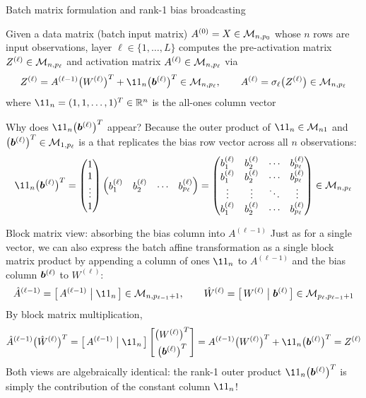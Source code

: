 \documentclass[aspectratio=169]{beamer}\usepackage[]{graphicx}\usepackage[]{xcolor}
\begin{document}
\begin{frame}{Batch matrix formulation and rank-1 bias broadcasting}
\begin{importantdefinition}
\label{def:mlp-batch-layer}
Given a data matrix (batch input matrix) $A^{(0)} = X \in \mathcal{M}_{n, p_0}$ whose $n$ rows are input observations, layer $\ell \in \{1, \ldots, L\}$ computes the pre-activation matrix $Z^{(\ell)} \in \mathcal{M}_{n, p_\ell}$ and activation matrix $A^{(\ell)} \in \mathcal{M}_{n, p_\ell}$ via
\[
Z^{(\ell)} = A^{(\ell-1)} \big(W^{(\ell)}\big)^T + \11_n \big(\bb^{(\ell)}\big)^T \in \M_{n, p_\ell}, \qquad
A^{(\ell)} = \sigma_\ell\big(Z^{(\ell)}\big) \in \M_{n, p_\ell}
\]
where $\11_n = (1, 1, \ldots, 1)^T \in \IR^n$ is the all-ones column vector
\end{importantdefinition}
\vfill
Why does $\11_n \big(\bb^{(\ell)}\big)^T$ appear? Because the outer product of $\11_n \in \M_{n1}$ and $\big(\bm{b}^{(\ell)}\big)^T \in \mathcal{M}_{1, p_\ell}$ is a  that replicates the bias row vector across all $n$ observations:
\[
\11_n \big(\bb^{(\ell)}\big)^T =
\begin{pmatrix} 1 \\ 1 \\ \vdots \\ 1 \end{pmatrix}
\begin{pmatrix} b_1^{(\ell)} & b_2^{(\ell)} & \cdots & b_{p_\ell}^{(\ell)} \end{pmatrix}
=
\begin{pmatrix}
b_1^{(\ell)} & b_2^{(\ell)} & \cdots & b_{p_\ell}^{(\ell)} \\
b_1^{(\ell)} & b_2^{(\ell)} & \cdots & b_{p_\ell}^{(\ell)} \\
\vdots & \vdots & \ddots & \vdots \\
b_1^{(\ell)} & b_2^{(\ell)} & \cdots & b_{p_\ell}^{(\ell)}
\end{pmatrix} \in \M_{n, p_\ell}
\]
\end{frame}


\begin{frame}{Block matrix view: absorbing the bias column into $A^{(\ell-1)}$}
Just as for a single vector, we can also express the batch affine transformation as a single block matrix product by appending a column of ones $\11_n$ to $A^{(\ell-1)}$ and the bias column $\bm{b}^{(\ell)}$ to $W^{(\ell)}$:
\[
\hat{A}^{(\ell-1)} = \big[\, A^{(\ell-1)} \;\big|\; \11_n \,\big] \in \M_{n, p_{\ell-1}+1}, \qquad
\hat{W}^{(\ell)} = \big[\, W^{(\ell)} \;\big|\; \bb^{(\ell)} \,\big] \in \M_{p_\ell, p_{\ell-1}+1}
\]
\vfill
By block matrix multiplication,
\[
\hat{A}^{(\ell-1)} \big(\hat{W}^{(\ell)}\big)^T
=
\big[\, A^{(\ell-1)} \;\big|\; \11_n \,\big]
\begin{bmatrix} \big(W^{(\ell)}\big)^T \\[3pt] \big(\bb^{(\ell)}\big)^T \end{bmatrix}
=
A^{(\ell-1)} \big(W^{(\ell)}\big)^T + \11_n \big(\bb^{(\ell)}\big)^T = Z^{(\ell)}
\]
\vfill
Both views are algebraically identical: the rank-1 outer product $\11_n \big(\bb^{(\ell)}\big)^T$ is simply the contribution of the constant column $\11_n$!
\end{frame}
\end{document}
